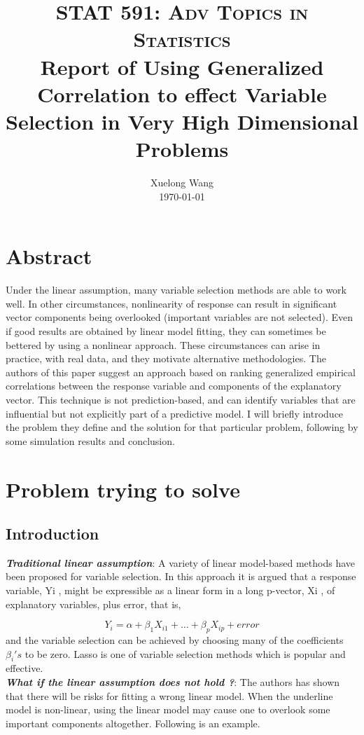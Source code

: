 \documentclass[paper=a4, fontsize=12pt]{scrartcl}
\title{
		\usefont{OT1}{bch}{b}{n}
		\normalfont \normalsize \textsc{STAT 591: Adv Topics in Statistics} \\ [10pt]
		\huge Report of Using Generalized Correlation to effect Variable Selection in Very High Dimensional Problems \\
}
\author{
		\normalfont 								\normalsize
        Xuelong Wang \\[-3pt]		\normalsize
        \today
}
\date{}
\numberwithin{equation}{section}
\numberwithin{figure}{section}
\numberwithin{table}{section}
\begin{document}
\maketitle
\section{Abstract}
\singlespacing
Under the linear assumption, many variable selection methods are able to work well. In other circumstances, nonlinearity of response can result in significant vector components being overlooked (important variables are not selected). Even if good results are obtained by linear model fitting, they can sometimes be bettered by using a nonlinear approach. These circumstances can arise in practice, with real data, and they motivate alternative methodologies. The authors of this paper suggest an approach based on ranking generalized empirical correlations between the response variable and components of the explanatory vector. This technique is not prediction-based, and can identify variables that are influential but not explicitly part of a predictive model. I will briefly introduce the problem they define and the solution for that particular problem, following by some simulation results and conclusion. 

\section{Problem trying to solve}
\subsection{Introduction}
\textit{\textbf{Traditional linear assumption}}: A variety of linear model-based methods have been proposed for variable selection. In this approach it is argued that a response variable, Yi , might be expressible as a linear form in a long p-vector, Xi , of explanatory variables, plus error, that is,

\[
  Y_i = \alpha + \beta_1X_{i1} + \dots + \beta_{p}X_{ip} + error
\]
and the variable selection can be achieved by choosing many of the coefficients $\beta_i's$ to be zero. Lasso is one of variable selection methods which is popular and effective. \\

\textit{\textbf{What if the linear assumption does not hold ?}}: The authors has shown that there will be risks for fitting a wrong linear model. When the underline model is non-linear, using the linear model may cause one to overlook some important components altogether. Following is an example.\\
\end{document}
